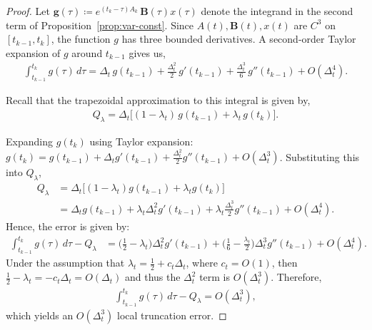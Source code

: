 \documentclass{article}
\def\vg{{\bm{g}}}
\def\bB{{\bm{B}}}
\theoremstyle{plain}
\theoremstyle{definition}
\theoremstyle{remark}
\begin{document}
\begin{proof}
Let $\vg(\tau) \coloneqq e^{(t_k-\tau) A_k}\,\bB(\tau)x(\tau)$ denote the 
integrand in the second term of Proposition~\ref{prop:var-const}.  
Since $A(t),\bB(t),x(t)$ are $C^3$ on $[t_{k-1},t_k]$, the function $g$ has three
bounded derivatives.  
A second-order Taylor expansion of $g$ around $t_{k-1}$ gives us,
\begin{align*}
\int_{t_{k-1}}^{t_k} g(\tau)\,d\tau
=
\Delta_t\, g(t_{k-1})
+ \frac{\Delta_t^2}{2}\, g'(t_{k-1})
+ \frac{\Delta_t^3}{6}\, g''(t_{k-1})
+ O(\Delta_t^4).
\end{align*}

Recall that the trapezoidal approximation to this integral is given by,
\begin{align*}
    Q_\lambda
    =
    \Delta_t \Big[(1-\lambda_t)\, g(t_{k-1})
    + \lambda_t\, g(t_k)\Big].
\end{align*}

Expanding $g(t_k)$ using Taylor expansion:
$
g(t_k)
= g(t_{k-1}) + \Delta_t g'(t_{k-1})
+ \frac{\Delta_t^2}{2} g''(t_{k-1}) + O(\Delta_t^3)
$.
Substituting this into $Q_\lambda$,
\begin{align*}
Q_\lambda
&= \Delta_t\Big[(1-\lambda_t) g(t_{k-1})
    + \lambda_t g(t_k)\Big] \\
&= \Delta_t g(t_{k-1})
  + \lambda_t \Delta_t^2 g'(t_{k-1})
  + \lambda_t \frac{\Delta_t^3}{2} g''(t_{k-1})
  + O(\Delta_t^4).
\end{align*}
Hence, the error is given by:
\begin{align*}
\int_{t_{k-1}}^{t_k} g(\tau)\,d\tau - Q_\lambda
&= \Big(\tfrac{1}{2} - \lambda_t\Big)\Delta_t^2 g'(t_{k-1})
 + \Big(\tfrac{1}{6} - \tfrac{\lambda_t}{2}\Big)\Delta_t^3 g''(t_{k-1})
 + O(\Delta_t^4).
\end{align*}
Under the assumption that $\lambda_t = \tfrac{1}{2} + c_t \Delta_t$, where $c_t = O(1)$, then
$\tfrac{1}{2} - \lambda_t = -c_t \Delta_t = O(\Delta_t)$ and thus the
$\Delta_t^2$ term is $O(\Delta_t^3)$. Therefore,
\begin{align*}
    \int_{t_{k-1}}^{t_k} g(\tau)\,d\tau - Q_\lambda = O(\Delta_t^3),
\end{align*}
which yields an $O(\Delta_t^3)$ local truncation error. 
\end{proof}
\end{document}
